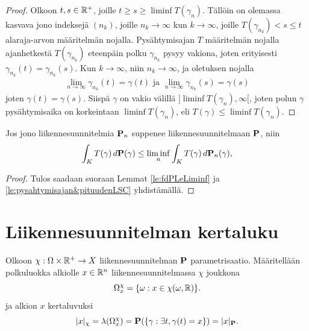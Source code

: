 \documentclass[12pt,oneside,a4paper]{amsbook} %
\begin{document}
\begin{proof}
    Olkoon $t, s \in \Rp$, joille $t \ge s \ge \liminf T(\gamma_n)$. Tällöin on olemassa kasvava jono indeksejä $(n_k)$, joille $n_k \to \infty$ kun $k \to \infty$, joille $T(\gamma_{n_k}) < s \le t$ alaraja-arvon määritelmän nojalla. Pysähtymisajan $T$ määritelmän nojalla ajanhetkestä $T(\gamma_{n_k})$ eteenpäin polku $\gamma_{n_k}$ pysyy vakiona, joten erityisesti $\gamma_{n_k}(t) = \gamma_{n_k}(s)$. Kun $k \to \infty$, niin $n_k \to \infty$, ja oletuksen nojalla
    \begin{align*}
        \lim_{n\to \infty} \gamma_{n_k}(t) = \gamma(t) \text{ ja } \lim_{n\to \infty} \gamma_{n_k}(s) = \gamma(s)
    \end{align*}
    joten $\gamma(t) = \gamma(s)$. Siispä $\gamma$ on vakio välillä $]\liminf T(\gamma_n), \infty[$, joten polun $\gamma$ pysähtymisaika on korkeintaan $\liminf T(\gamma_n)$, eli $T(\gamma) \le \liminf T(\gamma_n)$.
    
\end{proof}

\begin{corollary}\label{le:keskipysahtymisajan&pituudenLSC}
    Jos jono liikennesuunnitelmia $\P_n$ suppenee liikennesuunnitelmaan $\P$, niin 
    \begin{equation*}
        \int_K T(\gamma) \, d\P(\gamma) \le \liminf_n \int_K T(\gamma) \, d\P_n(\gamma),
    \end{equation*}
\end{corollary}
\begin{proof}
    Tulos saadaan suoraan Lemmat \ref{le:fdPLeLiminf} ja \ref{le:pysahtymisajan&pituudenLSC} yhdistämällä.
\end{proof}

\section{Liikennesuunnitelman kertaluku}

\begin{definition}
Olkoon $\chi : \Omega \times \R^+ \to X$ liikennesuunnitelman $\P$ parametrisaatio. Määritellään polkuluokka alkiolle $x\in \R^n$ liikennesuunnitelmassa $\chi$ joukkona
\begin{equation*}
    \Omega_x^\chi = \{\omega : x \in \chi(\omega, \R)\}.
\end{equation*}
ja alkion $x$ kertaluvuksi
    \begin{equation*}
        |x|_\chi = \lambda(\Omega_x^\chi) = \P(\{\gamma : \exists t, \gamma(t) = x\}) = |x|_\P.
    \end{equation*}
\end{definition}
\end{document}
